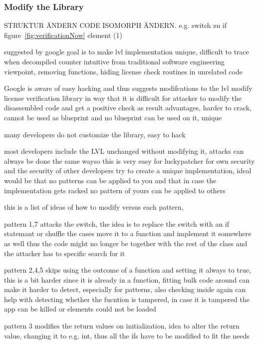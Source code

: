 \subsubsection{Modify the Library} \label{subsection:counter-modifications-library}
STRUKTUR ÄNDERN
CODE ISOMORPH ÄNDERN. e.g. switch zu if
figure~\ref{fig:verificationNow} element (1)

suggested by google
%
goal is to make lvl implementation unique, difficult to trace when decompiled
counter intuitive from traditional software engineering viewpoint, removing functions, hiding license check routines in unrelated code

Google is aware of easy hacking and thus suggests modifcations to the lvl
modify license verification library in way that it is difficult for attacker to modify the disassembled code and get a positive check as result
advantages, harder to crack, cannot be used as blueprint and no blueprint can be used on it, unique
\cite{developersSecuring}
%

many developers do not customize the library, easy to hack
\cite{munteanLicense}


most developers include the LVL unchanged without modifying it, attacks can always be done the same wayso this is very easy for luckypatcher
for own security and the security of other developers try to create a unique implementation,
ideal would be that no patterns can be applied to you and that in case the implementation gets racked no pattern of yours can be applied to others

this is a list of ideas of how to modify versus each pattern,

pattern 1,7 attacks the switch, the idea is to replace the switch with an if statemant or shuffle the cases
move it to a function and implement it somewhere as well thus the code might no longer be together with the rest of the class and the attacker has to specific search for it

pattern 2,4,5 skips using the outcome of a function and setting it always to true, this is a bit harder since it is already in a function, fitting bulk code around can make it harder to detect, especially for patterns, also checking inside again can help with detecting whether the fucntion is tampered, in case it is tampered the app can be killed or elements could not be loaded

pattern 3 modifies the return values on initialization, idea to alter the return value, changing it to e.g. int, thus all the ifs have to be modified to fit the needs


